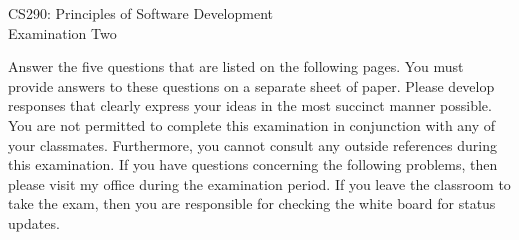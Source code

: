 \documentclass[12pt,epsf,psfig,graphicx]{article}
\def\widow#1{\vskip #1\vbadness10000\penalty-200\vskip-#1}
\begin{document}
\def\widow#1{\vskip #1\vbadness10000\penalty-200\vskip-#1}

\begin{center}

CS290: Principles of Software Development \\
Examination Two \\

\end{center}

\noindent Answer the five questions that are listed on the following pages.  You must provide answers to these questions
on a separate sheet of paper.  Please develop responses that clearly express your ideas in the most succinct manner
possible.  You are not permitted to complete this examination in conjunction with any of your classmates.  Furthermore,
you cannot consult any outside references during this examination.  If you have questions concerning the following
problems, then please visit my office during the examination period.  If you leave the classroom to take the exam, then
you are responsible for checking the white board for status updates.
\end{document}
